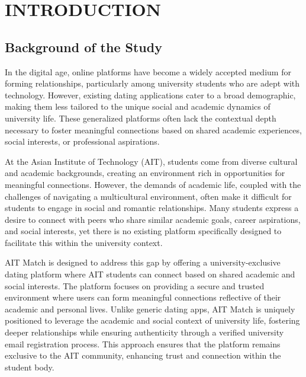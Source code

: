 \chapter{INTRODUCTION} 

\section{Background of the Study}
    In the digital age, online platforms have become a widely accepted medium for forming relationships, particularly among university students who are adept with technology. However, existing dating applications cater to a broad demographic, making them less tailored to the unique social and academic dynamics of university life. These generalized platforms often lack the contextual depth necessary to foster meaningful connections based on shared academic experiences, social interests, or professional aspirations.

    At the Asian Institute of Technology (AIT), students come from diverse cultural and academic backgrounds, creating an environment rich in opportunities for meaningful connections. However, the demands of academic life, coupled with the challenges of navigating a multicultural environment, often make it difficult for students to engage in social and romantic relationships. Many students express a desire to connect with peers who share similar academic goals, career aspirations, and social interests, yet there is no existing platform specifically designed to facilitate this within the university context.
    
    AIT Match is designed to address this gap by offering a university-exclusive dating platform where AIT students can connect based on shared academic and social interests. The platform focuses on providing a secure and trusted environment where users can form meaningful connections reflective of their academic and personal lives. Unlike generic dating apps, AIT Match is uniquely positioned to leverage the academic and social context of university life, fostering deeper relationships while ensuring authenticity through a verified university email registration process. This approach ensures that the platform remains exclusive to the AIT community, enhancing trust and connection within the student body.

\newpage
